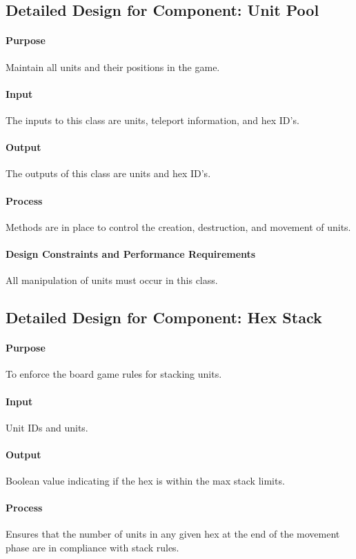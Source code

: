 \documentclass[12pt,a4paper,titlepage]{article}
\begin{document}
\subsection{Detailed Design for Component: Unit Pool}
\paragraph{Purpose} Maintain all units and their positions in the game.
\paragraph{Input} The inputs to this class are units, teleport information, and hex ID's.
\paragraph{Output} The outputs of this class are units and hex ID's. 
\paragraph{Process} Methods are in place to control the creation, destruction, and movement of units.
\paragraph{Design Constraints and Performance Requirements} All manipulation of units must occur in this class.

\subsection{Detailed Design for Component: Hex Stack}
\paragraph{Purpose} To enforce the board game rules for stacking units.
\paragraph{Input} Unit IDs and units. 
\paragraph{Output} Boolean value indicating if the hex is within the max stack limits.
\paragraph{Process} Ensures that the number of units in any given hex at the end of the movement phase are in compliance with stack rules.
\end{document}
